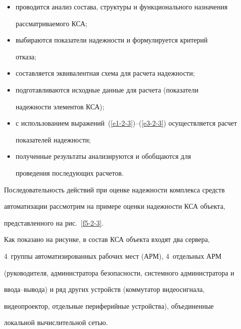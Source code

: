      \begin{itemize}


\item проводится анализ состава, структуры и функционального назначения 


рассматриваемого КСА;


\item выбираются показатели  надежности и формулируется  критерий 


отказа;


\item составляется эквивалентная схема для расчета надежности;


\item подготавливаются исходные данные для расчета (показатели 


надежности элементов КСА);


\item с использованием выражений~(\ref{e1-2-3})--(\ref{e3-2-3}) осуществляется расчет 


показателей на\-деж\-ности;


\item полученные    результаты    анализируются    и    обобщаются    для    


проведения последующих расчетов. 


\end{itemize}





     Последовательность действий при оценке надежности комплекса средств 


автоматизации рассмотрим на примере оценки надежности КСА объекта, 


пред\-став\-лен\-но\-го на рис.~\ref{f5-2-3}.


     


     Как показано на рисунке, в состав КСА объекта входят два сервера, 


4~группы автоматизированных рабочих мест (АРМ), 4~отдельных АРМ 


(руководителя, администратора безопасности, системного администратора и 


ввода--вывода) и ряд других устройств (коммутатор видеосигнала, 


видеопроектор, отдельные периферийные устройства), объединенные 


локальной вычислительной сетью.





